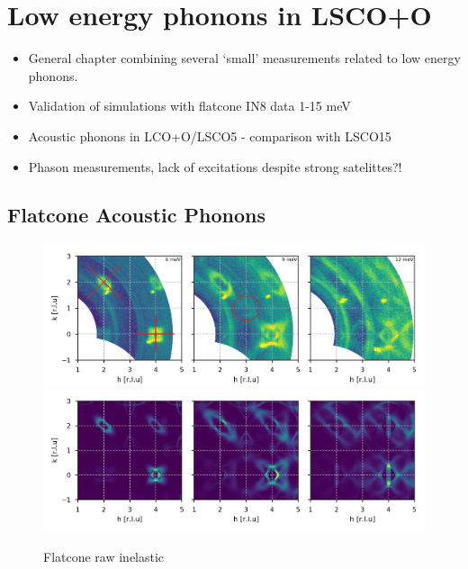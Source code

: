 \chapter{Low energy phonons in LSCO+O}

\begin{framed}
    \begin{itemize}
        \item General chapter combining several `small' measurements related to low energy phonons.
        \item Validation of simulations with flatcone IN8 data 1-15 meV
        \item Acoustic phonons in LCO+O/LSCO5 - comparison with LSCO15
        \item Phason measurements, lack of excitations despite strong satelittes?!
    \end{itemize}        
\end{framed}


\section{Flatcone Acoustic Phonons}

\begin{figure}
    \includegraphics[width=\textwidth]{fig/lowen/flatcone_colorplots.png}
    \includegraphics[width=\textwidth]{fig/lowen/simulation_colorplots.png}
    \caption[Flatcone raw inelastic]{Flatcone raw inelastic}
    \label{fig:flatcone_raw_inelastic}
\end{figure}


